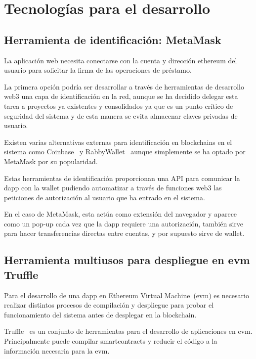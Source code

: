 \section{Tecnologías para el desarrollo}

\subsection{Herramienta de identificación: MetaMask}
La aplicación web necesita conectarse con la cuenta y dirección \gls{ethereum} 
del usuario para solicitar la firma de las operaciones de préstamo.

La primera opción podría ser desarrollar a través de herramientas de desarrollo
\gls{web3} una capa de identificación en la red, aunque se ha decidido delegar 
esta tarea a proyectos ya existentes y consolidados ya que es un punto crítico de 
seguridad del sistema y de esta manera se evita almacenar claves privadas de usuario.

Existen varias alternativas externas para identificación en \glspl{blockchain}
en el sistema como Coinbase~\cite{[11]} y RabbyWallet~\cite{[12]} aunque simplemente 
se ha optado por MetaMask por su popularidad.

Estas herramientas de identificación proporcionan una API para comunicar la 
\gls{dapp} con la \gls{wallet} pudiendo automatizar a través de funciones \gls{web3}
las peticiones de autorización al usuario que ha entrado en el sistema.

En el caso de MetaMask, esta actúa como extensión del navegador y aparece como un
\gls{pop-up} cada vez que la \gls{dapp} requiere una autorización, también sirve 
para hacer transferencias directas entre cuentas, y por supuesto sirve de \gls{wallet}.

\subsection{Herramienta multiusos para despliegue en \gls{evm} Truffle}

Para el desarrollo de una \gls{dapp} en Ethereum Virtual Machine~(\gls{evm}) es 
necesario realizar distintos procesos de compilación y despliegue para probar el 
funcionamiento del sistema antes de desplegar en la \gls{blockchain}.

Truffle~\cite{[18]} es un conjunto de herramientas para el desarrollo de 
aplicaciones en \gls{evm}. Principalmente puede compilar \glspl{smartcontract} y 
reducir el código a la información necesaria para la \gls{evm}.

